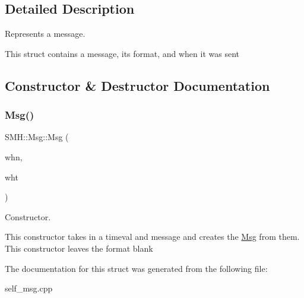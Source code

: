 \subsection{Detailed Description}
Represents a message. 

This struct contains a message, its format, and when it was sent 

\subsection{Constructor \& Destructor Documentation}
\mbox{\label{struct_s_m_h_1_1_msg_a8c0752c26661975e08bdf6321eeea6b5}} 
\subsubsection{\texorpdfstring{Msg()}{Msg()}}
{\footnotesize\ttfamily S\+M\+H\+::\+Msg\+::\+Msg (\begin{DoxyParamCaption}\item[{const timeval \&}]{whn,  }\item[{const C\+String}]{wht }\end{DoxyParamCaption})\hspace{0.3cm}{\ttfamily [inline]}}



Constructor. 

This constructor takes in a timeval and message and creates the \hyperlink{struct_s_m_h_1_1_msg}{Msg} from them. This constructor leaves the format blank 

The documentation for this struct was generated from the following file\+:\begin{DoxyCompactItemize}
\item 
self\+\_\+msg.\+cpp\end{DoxyCompactItemize}
